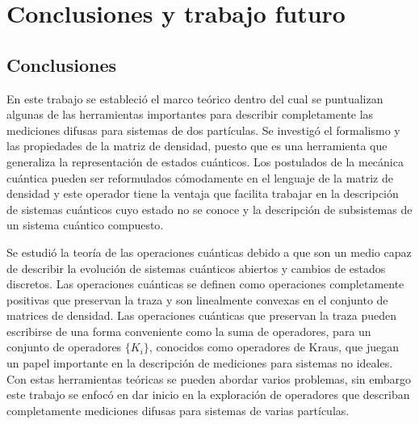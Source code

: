 \chapter{Conclusiones y trabajo futuro}

\section{Conclusiones}


En este trabajo se estableció el marco teórico dentro del cual se puntualizan algunas de las herramientas importantes para describir completamente las mediciones difusas para sistemas de dos partículas. Se investigó el formalismo y las propiedades de la matriz de densidad, puesto que es una herramienta que generaliza la representación de estados cuánticos. Los postulados de la mecánica cuántica pueden ser reformulados cómodamente en el lenguaje de la matriz de densidad y este operador tiene la ventaja que facilita trabajar en la descripción de sistemas cuánticos cuyo estado no se conoce  y la descripción de subsistemas de un sistema cuántico compuesto. 

Se estudió la teoría de las operaciones cuánticas debido a que son un medio capaz de describir la evolución de sistemas cuánticos abiertos y cambios de estados discretos. Las operaciones cuánticas se definen como operaciones completamente positivas que preservan la traza y son linealmente convexas en el conjunto de matrices de densidad. Las operaciones cuánticas que preservan la traza pueden escribirse de una forma conveniente como la suma de operadores, para un conjunto de operadores $\{K_i\}$, conocidos como operadores de Kraus, que juegan un papel importante en la descripción de mediciones para sistemas no ideales. Con estas herramientas teóricas se pueden abordar varios problemas, sin embargo este trabajo se enfocó en dar inicio en la exploración de operadores que describan completamente mediciones difusas para sistemas de varias partículas. %


